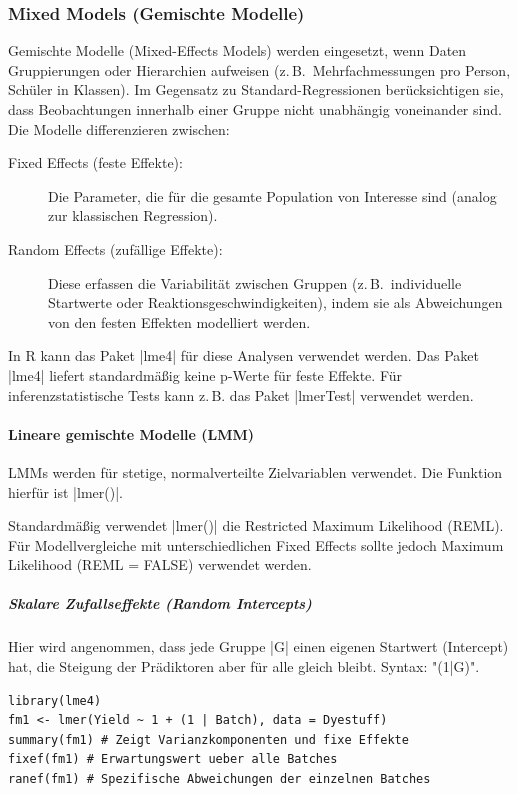 \documentclass[10pt,twocolumn]{scrartcl}
\renewcommand{\lstinline}{\mycoloredinline}
\begin{document}
\subsubsection{Mixed Models (Gemischte Modelle)}

Gemischte Modelle (Mixed-Effects Models) werden eingesetzt, wenn Daten Gruppierungen oder Hierarchien aufweisen (z.\,B.\ Mehrfachmessungen pro Person, Schüler in Klassen). Im Gegensatz zu Standard-Regressionen berücksichtigen sie, dass Beobachtungen innerhalb einer Gruppe nicht unabhängig voneinander sind.
Die Modelle differenzieren zwischen:

\begin{description}
\item[Fixed Effects (feste Effekte):] Die Parameter, die für die gesamte Population von Interesse sind (analog zur klassischen Regression).
\item[Random Effects (zufällige Effekte):] Diese erfassen die Variabilität zwischen Gruppen (z.\,B.\ individuelle Startwerte oder Reaktionsgeschwindigkeiten), indem sie als Abweichungen von den festen Effekten modelliert werden.
\end{description}

In R kann das Paket \lstinline|lme4| für diese Analysen verwendet werden. Das Paket \lstinline|lme4| liefert standardmäßig keine p-Werte für feste Effekte. Für inferenzstatistische Tests kann z.\,B. das Paket \lstinline|lmerTest| verwendet werden.

\paragraph{Lineare gemischte Modelle (LMM)}
LMMs werden für stetige, normalverteilte Zielvariablen verwendet. Die Funktion hierfür ist \lstinline|lmer()|.

Standardmäßig verwendet \lstinline|lmer()| die Restricted Maximum Likelihood (REML). Für Modellvergleiche mit unterschiedlichen Fixed Effects sollte jedoch Maximum Likelihood (REML = FALSE) verwendet werden.

\subparagraph{Skalare Zufallseffekte (Random Intercepts)}
Hier wird angenommen, dass jede Gruppe \lstinline|G| einen eigenen Startwert (Intercept) hat, die Steigung der Prädiktoren aber für alle gleich bleibt. Syntax: \lstinline"(1|G)".
\begin{lstlisting}
library(lme4)
fm1 <- lmer(Yield ~ 1 + (1 | Batch), data = Dyestuff)
summary(fm1) # Zeigt Varianzkomponenten und fixe Effekte
fixef(fm1) # Erwartungswert ueber alle Batches
ranef(fm1) # Spezifische Abweichungen der einzelnen Batches
\end{lstlisting}
\end{document}
